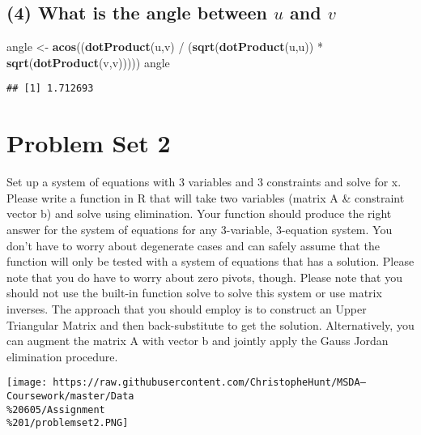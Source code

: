 \documentclass[]{article}
\newenvironment{Shaded}{\begin{snugshade}}{\end{snugshade}}
\newcommand{\KeywordTok}[1]{\textcolor[rgb]{0.13,0.29,0.53}{\textbf{{#1}}}}
\newcommand{\StringTok}[1]{\textcolor[rgb]{0.31,0.60,0.02}{{#1}}}
\newcommand{\NormalTok}[1]{{#1}}
\begin{document}
\newpage

\subsection{\texorpdfstring{(4) What is the angle between \(u\) and
\(v\)}{(4) What is the angle between u and v}}\label{what-is-the-angle-between-u-and-v}

\begin{Shaded}
\begin{Highlighting}[]
\NormalTok{angle <-}\StringTok{ }\KeywordTok{acos}\NormalTok{((}\KeywordTok{dotProduct}\NormalTok{(u,v) /}\StringTok{ }\NormalTok{(}\KeywordTok{sqrt}\NormalTok{(}\KeywordTok{dotProduct}\NormalTok{(u,u)) *}\StringTok{ }\KeywordTok{sqrt}\NormalTok{(}\KeywordTok{dotProduct}\NormalTok{(v,v)))))}
\NormalTok{angle}
\end{Highlighting}
\end{Shaded}

\begin{verbatim}
## [1] 1.712693
\end{verbatim}

\section{Problem Set 2}\label{problem-set-2}

Set up a system of equations with 3 variables and 3 constraints and
solve for x. Please write a function in R that will take two variables
(matrix A \& constraint vector b) and solve using elimination. Your
function should produce the right answer for the system of equations for
any 3-variable, 3-equation system. You don't have to worry about
degenerate cases and can safely assume that the function will only be
tested with a system of equations that has a solution. Please note that
you do have to worry about zero pivots, though. Please note that you
should not use the built-in function solve to solve this system or use
matrix inverses. The approach that you should employ is to construct an
Upper Triangular Matrix and then back-substitute to get the solution.
Alternatively, you can augment the matrix A with vector b and jointly
apply the Gauss Jordan elimination procedure.

\texttt{[image: https://raw.githubusercontent.com/ChristopheHunt/MSDA---Coursework/master/Data\\\%20605/Assignment\\\%201/problemset2.PNG]}
\end{document}
